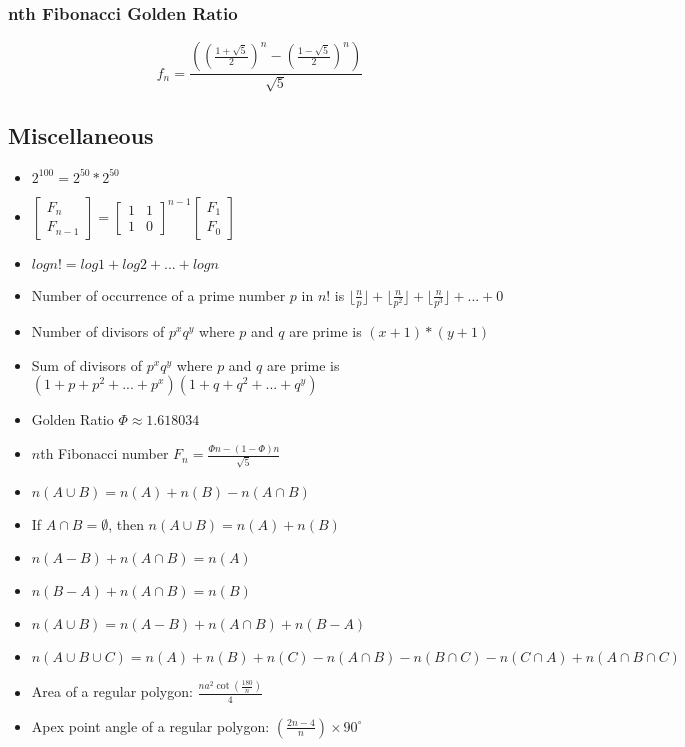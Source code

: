 \documentclass[10pt, a4paper,twocolumn]{article}
\begin{document}
\subsubsection{nth Fibonacci Golden Ratio} 
\[
f_n = \frac{\left( \left( \frac{1 + \sqrt{5}}{2} \right)^n - \left( \frac{1 - \sqrt{5}}{2} \right)^n \right)}{\sqrt{5}}
\]




\subsection{Miscellaneous}
\begin{itemize}
	\item \(2^{100} = 2^{50} * 2^{50}\)
	\item \( 
        \begin{bmatrix}
            F_n\\
            F_{n-1}
        \end{bmatrix} = 
        \begin{bmatrix}
            1 & 1\\
            1 & 0
        \end{bmatrix} ^ {n-1}
        \begin{bmatrix}
            F_1\\
            F_0
        \end{bmatrix}
    \)
    \item \(
        logn! = log1 +log2+...+logn
    \)
    \item Number of occurrence of a prime number $p$ in $n!$ is \(
    	\lfloor \frac{n}{p} \rfloor +	
    	\lfloor \frac{n}{p^2} \rfloor + 
    	\lfloor \frac{n}{p^3} \rfloor + ... + 0
    \)
    \item Number of divisors of $p^xq^y$ where $p$ and $q$ are prime is \(
    	(x + 1) * (y + 1)
    \)
    \item Sum of divisors of $p^xq^y$ where $p$ and $q$ are prime is \(
    	(1 + p + p^2 + ... + p^x) (1 + q + q^2 + ... + q^y)
    \)
   \item Golden Ratio \(
   	\Phi \approx 1.618034
   \)
   \item $n$th Fibonacci number \(
   	F_n = \frac{\Phi n - ( 1 - \Phi)n} {\sqrt{5}}
   \)
   \item \(n(A \cup B) = n(A) + n(B) - n(A \cap B)\)
   \item If \(A \cap B = \emptyset\), then \(n(A \cup B) = n(A) + n(B)\)
   \item \(n(A - B) + n(A \cap B) = n(A)\)
   \item \(n(B - A) + n(A \cap B) = n(B)\)
   \item \(n(A \cup B) = n(A - B) + n(A \cap B) + n(B - A)\)
   \item \(n(A \cup B \cup C) = n(A) + n(B) + n(C) - n(A \cap B) - n(B \cap C) - n(C \cap A) + n(A \cap B \cap C)\)
   \item Area of a regular polygon: \(\frac{n a^2 \cot\left(\frac{180}{n}\right)}{4}\)
   \item Apex point angle of a regular polygon: \(\left( \frac{2n - 4}{n} \right) \times 90^\circ\)
\end{itemize}
\end{document}
